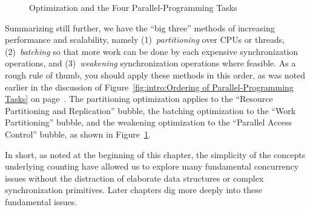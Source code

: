 \begin{figure}[tb]
\begin{center}
\end{center}
\caption{Optimization and the Four Parallel-Programming Tasks}
\label{fig:count:Optimization and the Four Parallel-Programming Tasks}
\end{figure}

Summarizing still further, we have the ``big three'' methods of
increasing performance and scalability, namely
(1)~\emph{partitioning} over CPUs or threads,
(2)~\emph{batching} so that more work can be done by each expensive
synchronization operations, and
(3)~\emph{weakening} synchronization operations where feasible.
As a rough rule of thumb, you should apply these methods in this order,
as was noted earlier in the discussion of
Figure~\ref{fig:intro:Ordering of Parallel-Programming Tasks}
on
page~\pageref{fig:intro:Ordering of Parallel-Programming Tasks}.
The partitioning optimization applies to the
``Resource Partitioning and Replication'' bubble,
the batching optimization to the ``Work Partitioning'' bubble,
and the weakening optimization to the ``Parallel Access Control'' bubble,
as shown in
Figure~\ref{fig:count:Optimization and the Four Parallel-Programming Tasks}.

In short, as noted at the beginning of this chapter, the simplicity
of the concepts underlying counting have allowed us to explore many
fundamental concurrency issues without the distraction of elaborate
data structures or complex synchronization primitives.
Later chapters dig more deeply into these fundamental issues.
